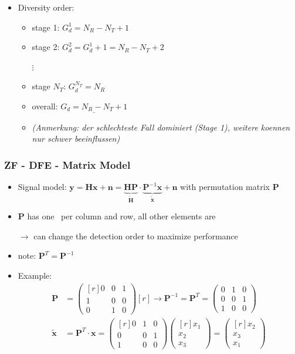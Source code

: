 \documentclass[a4paper, 10pt]{article}
\begin{document}
\begin{itemize}
\begin{itemize}
	\end{itemize}
	\item Diversity order:
	\begin{itemize}
		\item stage 1: $G_d^1 = N_R - N_T + 1 $
		\item stage 2: $G_d^2 = G_d^1 + 1 = N_R - N_T +2 $
		\item[ $\vdots$]
		\item stage $N_T$: $G_d^{N_T} = N_R $
		\item overall: $\underline{G_d = N_R - N_T +1} $
		\item \textit{(Anmerkung: der schlechteste Fall dominiert (Stage 1), weitere koennen nur schwer beeinflussen)}
	\end{itemize}
\end{itemize}
\subsubsection*{ZF - DFE - Matrix Model}
\begin{itemize}
	\item Signal model: $ \mathbf{y} = \mathbf{Hx} + \mathbf{n} = \underbrace{\mathbf{HP}}_{\tilde{\mathbf{H}}}\cdot\underbrace{\mathbf{P}^{-1}\mathbf{x}}_{\tilde{\mathbf{x}}} + \mathbf{n} $ with permutation matrix $\mathbf{P} $
	\item $\mathbf{P} $ has one \grqq\, per column and row, all other elements are \grqq 
	\item[$\rightarrow$] can change the detection order to maximize performance
	\item note: $\mathbf{P}^T = \mathbf{P}^{-1} $
	\item Example: 
	\begin{align*}
		\mathbf{P} &= \begin{pmatrix*}[r] 0 & 0 & 1\\1 & 0 & 0\\ 0 & 1 & 0	\end{pmatrix*}[r] \rightarrow \mathbf{P}^{-1} = \mathbf{P}^T = \begin{pmatrix*}0 & 1 & 0\\0 & 0 & 1\\ 1 & 0 & 0\end{pmatrix*}\\
		\tilde{\mathbf{x}} &= \mathbf{P}^T\cdot\mathbf{x} = \begin{pmatrix*}[r] 0 & 1 & 0\\ 0 & 0 & 1\\ 1 & 0 & 0\end{pmatrix*}\begin{pmatrix*}[r]x_1 \\x_2\\x_3\end{pmatrix*} = \begin{pmatrix*}[r]x_2\\x_3\\x_1\end{pmatrix*}
	\end{align*}
\end{itemize}
\end{document}
